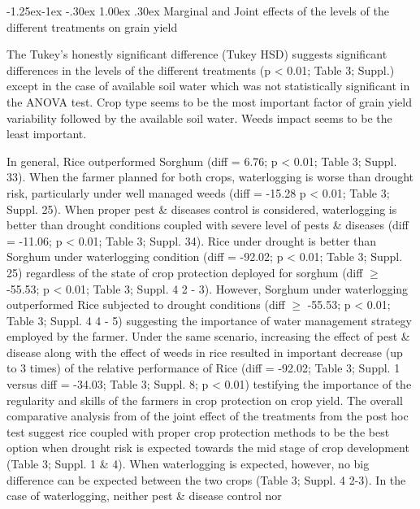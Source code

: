 \documentclass[12pt,oneside]{article}
\makeatletter
\renewcommand\subparagraph{\@startsection{subparagraph}{5}{\z@}%
            {-1.25ex\@plus -1ex \@minus -.30ex}%
            {1.00ex \@plus .30ex}%
            {\normalfont\normalsize\bfseries\itshape}}
\makeatother
\begin{document}
\hypertarget{marginal-and-joint-effects-of-the-levels-of-the-different-treatments-on-grain-yield}{%
\subparagraph{Marginal and Joint effects of the levels of the different
treatments on grain
yield}\label{marginal-and-joint-effects-of-the-levels-of-the-different-treatments-on-grain-yield}}

The Tukey's honestly significant difference (Tukey HSD) suggests
significant differences in the levels of the different treatments (p
\textless{} 0.01; Table 3; Suppl.) except in the case of available soil
water which was not statistically significant in the ANOVA test. Crop
type seems to be the most important factor of grain yield variability
followed by the available soil water. Weeds impact seems to be the least
important.

In general, Rice outperformed Sorghum (diff = 6.76; p \textless{} 0.01;
Table 3; Suppl. 33). When the farmer planned for both crops,
waterlogging is worse than drought risk, particularly under well managed
weeds (diff = -15.28 p \textless{} 0.01; Table 3; Suppl. 25). When
proper pest \& diseases control is considered, waterlogging is better
than drought conditions coupled with severe level of pests \& diseases
(diff = -11.06; p \textless{} 0.01; Table 3; Suppl. 34). Rice under
drought is better than Sorghum under waterlogging condition (diff =
-92.02; p \textless{} 0.01; Table 3; Suppl. 25) regardless of the state
of crop protection deployed for sorghum (diff \(\geq\) -55.53; p
\textless{} 0.01; Table 3; Suppl. 4 2 - 3). However, Sorghum under
waterlogging outperformed Rice subjected to drought conditions (diff
\(\geq\) -55.53; p \textless{} 0.01; Table 3; Suppl. 4 4 - 5) suggesting
the importance of water management strategy employed by the farmer.
Under the same scenario, increasing the effect of pest \& disease along
with the effect of weeds in rice resulted in important decrease (up to 3
times) of the relative performance of Rice (diff = -92.02; Table 3;
Suppl. 1 versus diff = -34.03; Table 3; Suppl. 8; p \textless{} 0.01)
testifying the importance of the regularity and skills of the farmers in
crop protection on crop yield. The overall comparative analysis from of
the joint effect of the treatments from the post hoc test suggest rice
coupled with proper crop protection methods to be the best option when
drought risk is expected towards the mid stage of crop development
(Table 3; Suppl. 1 \& 4). When waterlogging is expected, however, no big
difference can be expected between the two crops (Table 3; Suppl. 4
2-3). In the case of waterlogging, neither pest \& disease control nor
\end{document}
